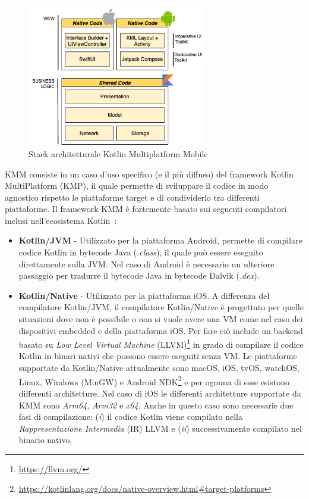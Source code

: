 \begin{figure}[H]
    \centering
    \includegraphics[width=0.7\textwidth]{img/stack_kmm.png}
    \caption{Stack architetturale Kotlin Multiplatform Mobile}
    \label{stackKMM}
\end{figure}

KMM consiste in un caso d'uso specifico (e il più diffuso) del framework Kotlin MultiPlatform (KMP), il quale permette di sviluppare il codice in modo agnostico rispetto le piattaforme target e di condividerlo tra differenti piattaforme. Il framework KMM è fortemente basato sui seguenti compilatori inclusi nell'ecosistema Kotlin~\cite{nagy2022simplifying}:

\begin{itemize}
    \item \textbf{Kotlin/JVM} - Utilizzato per la piattaforma Android, permette di compilare codice Kotlin in bytecode Java (\textit{.class}), il quale può essere eseguito direttamente sulla JVM. Nel caso di Android è necessario un ulteriore passaggio per tradurre il bytecode Java in bytecode Dalvik (\textit{.dex}).

    \item \textbf{Kotlin/Native} - Utilizzato per la piattaforma iOS. A differenza del compilatore Kotlin/JVM, il compilatore Kotlin/Native è progettato per quelle situazioni dove non è possibile o non si vuole avere una VM come nel caso dei dispositivi embedded e della piattaforma iOS. Per fare ciò include un backend basato su \textit{Low Level Virtual Machine} (LLVM)\footnote{\href{https://llvm.org/}{https://llvm.org/}} in grado di compilare il codice Kotlin in binari nativi che possono essere eseguiti senza VM\cite{nagy2022simplifying}. Le piattaforme supportate da Kotlin/Native attualmente sono macOS, iOS, tvOS, watchOS, Linux, Windows (MinGW) e Android NDK\footnote{\href{https://kotlinlang.org/docs/native-overview.html\#target-platforms}{https://kotlinlang.org/docs/native-overview.html\#target-platforms}} e per ognuna di esse esistono differenti architetture. Nel caso di iOS le differenti architetture supportate da KMM sono \textit{Arm64}, \textit{Arm32} e \textit{x64}. Anche in questo caso sono necessarie due fasi di compilazione: (\textit{i}) il codice Kotlin viene compilato nella \textit{Rappresentazione Intermedia} (IR) LLVM e (\textit{ii}) successivamente compilato nel binario nativo.
\end{itemize}

